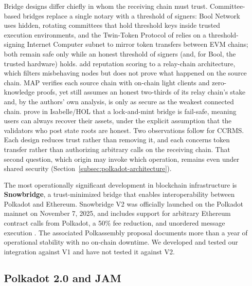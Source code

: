 Bridge designs differ chiefly in whom the receiving chain must trust. Committee-based bridges replace a single notary with a threshold of signers: Bool Network \citep{yinEtAl2022} uses hidden, rotating committees that hold threshold keys inside trusted execution environments, and the Twin-Token Protocol of \citet{kumarVEtAl2025} relies on a threshold-signing Internet Computer subnet to mirror token transfers between EVM chains; both remain safe only while an honest threshold of signers (and, for Bool, the trusted hardware) holds. \citet{chenKEtAl2023} add reputation scoring to a relay-chain architecture, which filters misbehaving nodes but does not prove what happened on the source chain. MAP \citep{caoEtAl2025} verifies each source chain with on-chain light clients and zero-knowledge proofs, yet still assumes an honest two-thirds of its relay chain's stake and, by the authors' own analysis, is only as secure as the weakest connected chain. \citet{maricEtAl2025} prove in Isabelle/HOL that a lock-and-mint bridge is fail-safe, meaning users can always recover their assets, under the explicit assumption that the validators who post state roots are honest. Two observations follow for CCRMS. Each design reduces trust rather than removing it, and each concerns token transfer rather than authorizing arbitrary calls on the receiving chain. That second question, which origin may invoke which operation, remains even under shared security (Section~\ref{subsec:polkadot-architecture}).

The most operationally significant development in blockchain infrastructure is \textbf{Snowbridge}, a trust-minimized bridge that enables interoperability between Polkadot and Ethereum. Snowbridge V2 was officially launched on the Polkadot mainnet on November 7, 2025, and includes support for arbitrary Ethereum contract calls from Polkadot, a 50\% fee reduction, and unordered message execution \citep{snowfork2025a}. The associated Polkassembly proposal \citep{snowfork2025b} documents more than a year of operational stability with no on-chain downtime. We developed and tested our integration against V1 and have not tested it against V2.

\subsection{Polkadot 2.0 and JAM}\label{subsec:polkadot-2-jam}

